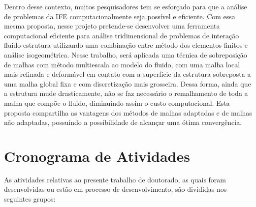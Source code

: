 \documentclass[tese_patricia.tex]{subfiles}
\begin{document}
Dentro desse contexto, muitos pesquisadores tem se esforçado para que a análise de problemas da IFE computacionalmente seja possível e eficiente. Com essa mesma proposta, nesse projeto pretende-se desenvolver uma ferramenta computacional eficiente para análise tridimensional de problemas de interação fluido-estrutura utilizando uma combinação entre método dos elementos finitos e análise isogeométrica.  Nesse trabalho, será aplicada uma técnica de sobreposição de malhas com método multiescala ao modelo do fluido, com uma malha local mais refinada e deformável em contato com a superfície da estrutura sobreposta a uma malha global fixa e com discretização mais grosseira. Dessa forma, ainda que a estrutura mude drasticamente, não se faz necessário o remalhamento de toda a malha que compõe o fluido, diminuindo assim o custo computacional. Esta proposta compartilha as vantagens dos métodos de malhas adaptadas e de malhas não adaptadas, possuindo a possibilidade de alcançar uma ótima convergência.


\section[Cronograma]{Cronograma de Atividades}


As atividades relativas ao presente trabalho de doutorado, as quais foram desenvolvidas ou estão em processo de desenvolvimento, são divididas nos seguintes grupos:
\end{document}
